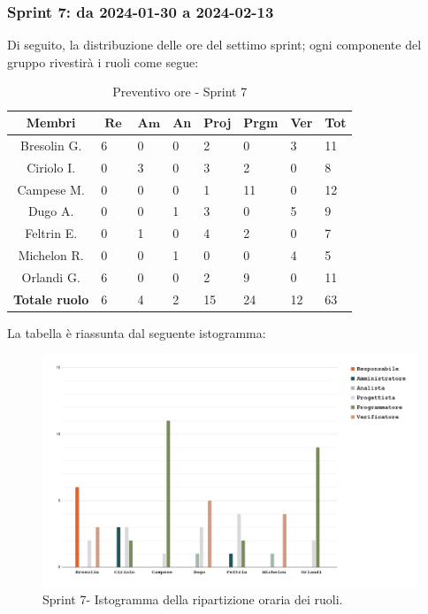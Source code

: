 \documentclass[10pt, a4paper]{article}
\begin{document}
{{{{{{{{{{{{{{\subsubsection{Sprint 7: da 2024-01-30 a 2024-02-13}
Di seguito, la distribuzione delle ore del settimo sprint; ogni componente del gruppo rivestirà i ruoli come segue:
\begin{table}[H]
\begin{tabularx}{\textwidth}{c|X|X|X|X|X|X|X}
        \textbf{Membri} & $\operatorname{\textbf{Re}}$ & $\mathrm{\textbf{Am}}$ & \textbf{An} & \textbf{Proj} & \textbf{Prgm} & \textbf{Ver} & \textbf{Tot} \\
        \hline Bresolin G. & \cellcolor{primarycolor}6 & 0 & 0 & 2 & 0 & 3 & 11 \\
        \hline Ciriolo I.  & 0 & \cellcolor{primarycolor}3 & 0 & 3 & 2 & 0 & 8 \\
        \hline Campese M.  & 0 & 0 & 0 & 1 & \cellcolor{primarycolor}11 & 0 & 12 \\
        \hline Dugo A.     & 0 & 0 & 1 & 3 & 0 & \cellcolor{primarycolor}5 & 9 \\
        \hline Feltrin E.  & 0 & 1 & 0 & \cellcolor{primarycolor}4 & 2 & 0 & 7 \\
        \hline Michelon R. & 0 & 0 & 1 & 0 & 0 & \cellcolor{primarycolor}4 & 5 \\
        \hline Orlandi G.  & 6 & 0 & 0 & 2 & \cellcolor{primarycolor}9 & 0 & 11 \\
        \hline
        \textbf{Totale ruolo} & 6 & 4 & 2 & 15 & 24 & 12 & 63 
    \end{tabularx}
    \caption{Preventivo ore - Sprint 7}
    \end{table}

La tabella è riassunta dal seguente istogramma:
 \begin{figure}[H]
        \centering        
        \includegraphics[width=15.5cm]{istogrammi/istogramma_7_periodo.png}
        \caption{Sprint 7- Istogramma della ripartizione oraria dei ruoli. }
    \end{figure}

}}}}}}}}}}}}}}
\end{document}
